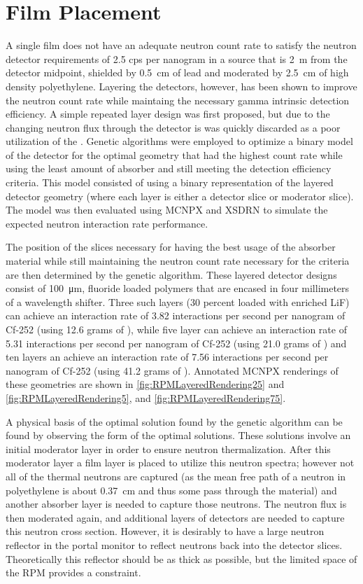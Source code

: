 \section{Film Placement}
A single film does not have an adequate neutron count rate to satisfy the neutron detector requirements of 2.5 cps per nanogram  in a source that is \SI{2}{\m} from the detector midpoint, shielded by \SI{0.5}{\cm} of lead and moderated by \SI{2.5}{\cm} of high density polyethylene.
Layering the detectors, however, has been shown to improve the neutron count rate while maintaing the necessary gamma intrinsic detection efficiency.
A simple repeated layer design was first proposed, but due to the changing neutron flux through the detector is was quickly discarded as a poor utilization of the .
Genetic algorithms were employed to optimize a binary model of the detector for the optimal geometry that had the highest count rate while using the least amount of absorber and still meeting the detection efficiency criteria.
This model consisted of using a binary representation of the layered detector geometry (where each layer is either a detector slice or moderator slice).
The model was then evaluated using MCNPX and XSDRN to simulate the expected neutron interaction rate performance.

The position of the slices necessary for having the best usage of the absorber material while still maintaining the neutron count rate necessary for the criteria are then determined by the genetic algorithm.
These layered detector designs consist of \SI{100}{\um},  fluoride loaded polymers that are encased in four millimeters of a wavelength shifter.
Three such layers (30 percent loaded with enriched LiF) can achieve an interaction rate of 3.82 interactions per second per nanogram of Cf-252 (using 12.6 grams of ), while five layer can achieve an interaction rate of 5.31 interactions per second per nanogram of Cf-252 (using 21.0 grams of )  and ten layers an achieve an interaction rate of 7.56 interactions per second per nanogram of Cf-252 (using 41.2 grams of ).
Annotated MCNPX renderings of these geometries are shown in \autoref{fig:RPMLayeredRendering25} and \autoref{fig:RPMLayeredRendering5}, and \autoref{fig:RPMLayeredRendering75}.

A physical basis of the optimal solution found by the genetic algorithm can be found by observing the form of the optimal solutions.
These solutions involve an initial moderator layer in order to ensure neutron thermalization.
After this moderator layer a film layer is placed to utilize this neutron spectra; however not all of the thermal neutrons are captured (as the mean free path of a neutron in polyethylene is about \SI{0.37}{\cm} and thus some pass through the material) and another absorber layer is needed to capture those neutrons.  
The neutron flux is then moderated again, and additional layers of detectors are needed to capture this neutron cross section.
However, it is desirably to have a large neutron reflector in the portal monitor to reflect neutrons back into the detector slices. 
Theoretically this reflector should be as thick as possible, but the limited space of the RPM provides a constraint.

